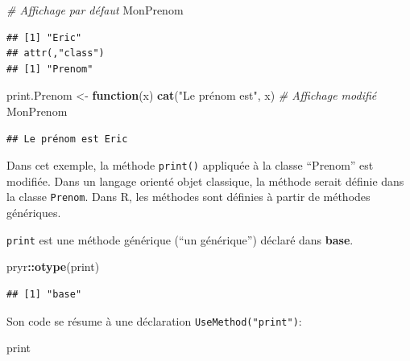 \documentclass[
  12pt,
  french,
  a4paper,
  extrafontsizes,onecolumn,openright
  ]{memoir}
\newenvironment{Shaded}{\begin{snugshade}}{\end{snugshade}}
\newcommand{\CommentTok}[1]{\textcolor[rgb]{0.56,0.35,0.01}{\textit{#1}}}
\newcommand{\ControlFlowTok}[1]{\textcolor[rgb]{0.13,0.29,0.53}{\textbf{#1}}}
\newcommand{\KeywordTok}[1]{\textcolor[rgb]{0.13,0.29,0.53}{\textbf{#1}}}
\newcommand{\NormalTok}[1]{#1}
\newcommand{\OperatorTok}[1]{\textcolor[rgb]{0.81,0.36,0.00}{\textbf{#1}}}
\newcommand{\StringTok}[1]{\textcolor[rgb]{0.31,0.60,0.02}{#1}}
\begin{document}
\begin{Shaded}
\begin{Highlighting}[]
\CommentTok{# Affichage par défaut}
\NormalTok{MonPrenom}
\end{Highlighting}
\end{Shaded}

\begin{verbatim}
## [1] "Eric"
## attr(,"class")
## [1] "Prenom"
\end{verbatim}

\begin{Shaded}
\begin{Highlighting}[]
\NormalTok{print.Prenom <-}\StringTok{ }\ControlFlowTok{function}\NormalTok{(x) }\KeywordTok{cat}\NormalTok{(}\StringTok{"Le prénom est"}\NormalTok{, x)}
\CommentTok{# Affichage modifié}
\NormalTok{MonPrenom}
\end{Highlighting}
\end{Shaded}

\begin{verbatim}
## Le prénom est Eric
\end{verbatim}

\normalsize

Dans cet exemple, la méthode \texttt{print()} appliquée à la classe \enquote{Prenom} est modifiée.
Dans un langage orienté objet classique, la méthode serait définie dans la classe \texttt{Prenom}.
Dans R, les méthodes sont définies à partir de méthodes génériques.

\texttt{print} est une méthode générique (\enquote{un générique}) déclaré dans \textbf{base}.

\scriptsize

\begin{Shaded}
\begin{Highlighting}[]
\NormalTok{pryr}\OperatorTok{::}\KeywordTok{otype}\NormalTok{(print)}
\end{Highlighting}
\end{Shaded}

\begin{verbatim}
## [1] "base"
\end{verbatim}

\normalsize

Son code se résume à une déclaration \texttt{UseMethod("print")}:

\scriptsize

\begin{Shaded}
\begin{Highlighting}[]
\NormalTok{print}
\end{Highlighting}
\end{Shaded}
\end{document}
